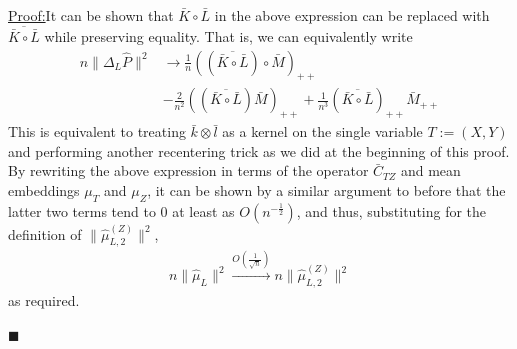 \documentclass[]{article}
\newenvironment{claimproof}[1]{\par\noindent\underline{Proof:}\space#1}{\hfill $\blacksquare$}
\begin{document}
\begin{claimproof}
It can be shown that $\bar{K}\circ \bar{L}$ in the above expression can be replaced with $\overline{\bar{K}\circ \bar{L}}$ while preserving equality. That is, we can equivalently write
\begin{align*}
n\|\Delta_L \hat{P}\|^2 & \longrightarrow \frac{1}{n}((\overline{\bar{K}\circ \bar{L}}) \circ \bar{M})_{++}\\& - \frac{2}{n^2}((\overline{\bar{K}\circ \bar{L}})\bar{M})_{++} + \frac{1}{n^3}(\overline{\bar{K}\circ \bar{L}})_{++}\bar{M}_{++}
\end{align*}
This is equivalent to treating $\bar{k}\otimes\bar{l}$ as a kernel on the single variable $T:=(X,Y)$ and performing another recentering trick as we did at the beginning of this proof. By rewriting the above expression in terms of the operator $\bar{C}_{TZ}$ and mean embeddings $\mu_T$ and $\mu_Z$, it can be shown by a similar argument to before that the latter two terms tend to 0 at least as $O(n^{-\frac{1}{2}})$, and thus, substituting for the definition of $\|\hat \mu^{(Z)}_{L,2} \|^2$,
\begin{align*}
 n \|\hat \mu_{L} \|^2 \xrightarrow{O(\frac{1}{\sqrt{n}})} n \|\hat \mu^{(Z)}_{L,2} \|^2
\end{align*} as required.


\end{claimproof}
\end{document}
